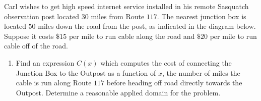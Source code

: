 \documentclass{ximera}
\begin{document}
\begin{example} \label{SasquatchCable} Carl wishes to get high speed internet service installed in his remote Sasquatch observation post located $30$ miles from Route $117$. The nearest junction box is located $50$ miles down the road from the post, as indicated in the diagram below.  Suppose it costs $\$ 15$ per mile to run cable along the road and $\$ 20$ per mile to run cable off of the road.


\begin{center}
% 

\end{center}


\begin{enumerate}

\item   Find an expression $C(x)$ which computes the cost of connecting the Junction Box to the Outpost as a function of $x$, the number of miles the cable is run along Route $117$ before heading off road directly towards the Outpost.  Determine a reasonable applied domain for the problem.


\end{enumerate}
\end{example}
\end{document}
